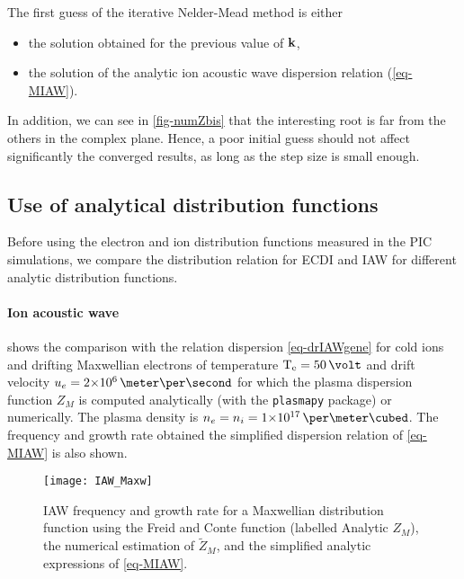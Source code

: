    The first guess of the iterative Nelder-Mead method is either 
    \begin{itemize}
      \item the solution obtained for the previous value of ${\mathbf k}$, 
      \item the solution of the analytic ion acoustic wave dispersion relation (\cref{eq-MIAW}).
    \end{itemize}
    In addition, we can see in \cref{fig-numZbis} that the interesting root is far from the others in the complex plane.
    Hence, a poor initial guess should not affect significantly the converged results, as long as the step size is small enough.
    


\subsection{Use of analytical distribution functions} \label{subsec-DRimpact}
  Before using the electron and ion distribution functions measured in the \ac{PIC} simulations, we compare the distribution relation for \ac{ECDI} and \ac{IAW} for different analytic distribution functions.
  
  \paragraph{Ion acoustic wave\\}
  
   shows the comparison with the relation dispersion \cref{eq-drIAWgene} for cold ions and drifting Maxwellian electrons of temperature $\Te=50\,\volt$ and drift velocity $u_e = \sn{2}{6} \,\meter\per\second$ for which the plasma dispersion function $Z_M$ is computed analytically (with the \texttt{plasmapy} package) or numerically.
  The plasma density is $n_e = n_i = \sn{1}{17} \,\per\meter\cubed$.
  The frequency and growth rate obtained the simplified dispersion relation of \cref{eq-MIAW} is also shown. 
  
  \begin{figure}[hbtp]
    \centering
    \texttt{[image: IAW\_Maxw]}
    \caption{\ac{IAW} frequency and growth rate for a Maxwellian distribution function using the Freid and Conte function (labelled Analytic $Z_M$), the numerical estimation of $\tilde{Z}_M$, and the simplified analytic expressions of \cref{eq-MIAW}. }
    \label{fig-IAW_Maxw}
  \end{figure}
  
